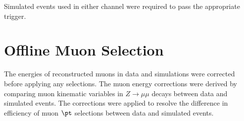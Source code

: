 %

Simulated events used in either channel were required to pass the appropriate trigger.


\section{Offline Muon Selection}
\label{sec:muonSelection}
The energies of reconstructed muons in data and simulations were corrected before applying any selections.  
The muon energy corrections were derived by comparing muon kinematic variables in $Z \rightarrow \mu\mu$ decays 
between data and simulated events.  The corrections were applied to resolve the difference in efficiency of 
muon $\pt$ selections between data and simulated events.

